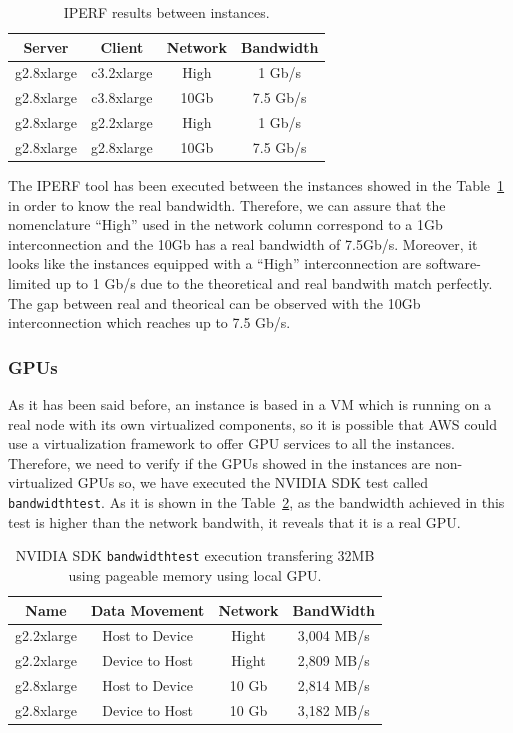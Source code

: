 \documentclass[a4paper,twoside]{article}
\begin{document}
\begin{table}[htb]
\renewcommand{\arraystretch}{1.3}
\caption{IPERF results between instances.}
\label{table:iperf}
\tabcolsep=0.24cm
\begin{center}\begin{tabular}{cccc}
Server & Client & Network & Bandwidth\\ \hline \hline
g2.8xlarge & c3.2xlarge & High & 1  Gb/s\\ \hline
g2.8xlarge & c3.8xlarge & 10Gb & 7.5  Gb/s\\ \hline
g2.8xlarge & g2.2xlarge & High & 1 Gb/s\\ \hline
g2.8xlarge & g2.8xlarge & 10Gb & 7.5  Gb/s\\ \hline
\end{tabular}\end{center}\end{table}

The IPERF tool has been executed between the instances showed in 
the Table~\ref{table:iperf} in order to know the real bandwidth.
Therefore, we can assure that the nomenclature ``High'' used in the 
network column correspond to a 1Gb interconnection and the 10Gb has 
a real bandwidth of 7.5Gb/s.
Moreover, it looks like the instances equipped with a ``High'' interconnection 
are software-limited up to 1 Gb/s due to the theoretical and real bandwith 
match perfectly. The gap between real and theorical can be observed with 
the 10Gb interconnection which reaches up to 7.5 Gb/s.


\subsubsection{GPUs}
As it has been said before, an instance is based in a VM 
which is running on a real node with its own virtualized 
components, so it is possible that AWS could use a virtualization 
framework to offer GPU services to all the instances.
Therefore, we need to verify if the GPUs showed in the instances are 
non-virtualized GPUs so, we have executed the NVIDIA SDK test called 
{\tt bandwidthtest}. As it is shown in the Table~\ref{table:bwt}, as the bandwidth achieved 
in this test is higher than the network bandwith, it reveals that it is a 
real GPU. 
\begin{table}[htb]
\renewcommand{\arraystretch}{1.3}
\caption{NVIDIA SDK {\tt bandwidthtest} execution transfering 32MB using pageable memory using local GPU.}
\label{table:bwt}
\tabcolsep=0.09cm
\begin{center}\begin{tabular}{cccc}
Name &  Data Movement & Network & BandWidth \\ \hline \hline
g2.2xlarge & Host to Device & Hight& 3,004 MB/s \\ \hline
g2.2xlarge & Device to Host & Hight& 2,809 MB/s\\ \hline
g2.8xlarge & Host to Device & 10 Gb& 2,814 MB/s\\ \hline
g2.8xlarge & Device to Host & 10 Gb& 3,182 MB/s\\ \hline
\end{tabular}\end{center}\end{table}
\end{document}
